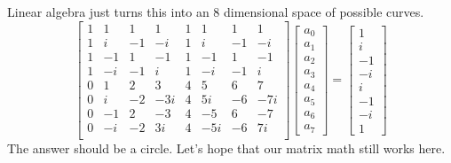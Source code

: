 \documentclass[12pt]{article}
\begin{document}
Linear algebra just turns this into an 8 dimensional space of possible curves.
$$ 
\left[ \begin{array}{rrrrrrrr}
1 & 1 & 1 & 1 & 1 & 1 & 1 & 1 \\
1 & i & -1 & -i & 1 & i & -1 & -i \\
1 & -1 & 1 & -1 & 1 & -1 & 1 & -1 \\
1 & -i & -1 & i & 1 & -i & -1 & i \\ \hline
0 & 1 & 2 & 3 & 4 & 5 & 6 & 7 \\
0 & i & -2 & -3i & 4 & 5i & -6 & -7i \\
0 & -1 & 2 & -3 & 4 & -5 & 6 & -7 \\
0 & -i & -2 & 3i & 4 & -5i & -6 & 7i \\
 \end{array} \right] 
 \left[ \begin{array}{c} a_0 \\
 a_1 \\ 
 a_2 \\ 
 a_3 \\ 
 a_4 \\ 
 a_5 \\ 
 a_6 \\ 
 a_7 \end{array} \right]
 = 
  \left[ \begin{array}{r} 1 \\
 i \\ 
 -1 \\ 
 -i \\ \hline
 i \\ 
 -1 \\ 
 -i \\ 
 1 \end{array} \right] $$
The answer should be a circle.  Let's hope that our matrix math still works here.
\end{document}
